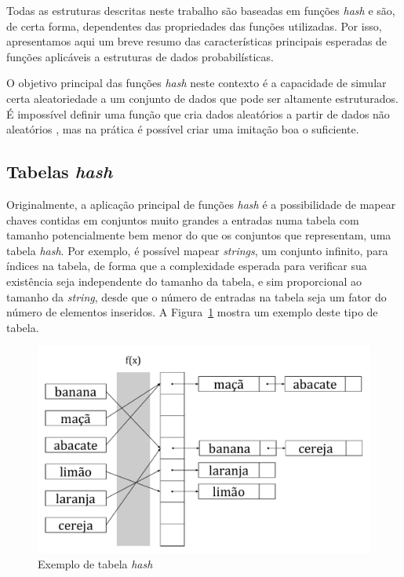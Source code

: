Todas as estruturas descritas neste trabalho são baseadas em funções \emph{hash} e são, de certa forma, dependentes das propriedades das funções utilizadas. Por isso, apresentamos aqui um breve resumo das características principais esperadas de funções aplicáveis a estruturas de dados probabilísticas.

O objetivo principal das funções \emph{hash} neste contexto é a capacidade de simular certa aleatoriedade a um conjunto de dados que pode ser altamente estruturados. É impossível definir uma função que cria dados aleatórios a partir de dados não aleatórios \cite{knuth1998art}, mas na prática é possível criar uma imitação boa o suficiente.

\subsection{Tabelas \emph{hash}}

Originalmente, a aplicação principal de funções \emph{hash} é a possibilidade de mapear chaves contidas em conjuntos muito grandes a entradas numa tabela com tamanho potencialmente bem menor do que os conjuntos que representam, uma tabela \emph{hash}. Por exemplo, é possível mapear \emph{strings}, um conjunto infinito, para índices na tabela, de forma que a complexidade esperada para verificar sua existência seja independente do tamanho da tabela, e sim proporcional ao tamanho da \emph{string}, desde que o número de entradas na tabela seja um fator do número de elementos inseridos. A Figura~\ref{fig:hashtable} mostra um exemplo deste tipo de tabela.

\begin{figure}[!htbp]
  \centering
  \includegraphics[scale=0.5]{figures/hashtable.pdf}
  \caption{Exemplo de tabela \emph{hash}}
  \label{fig:hashtable}
\end{figure}

